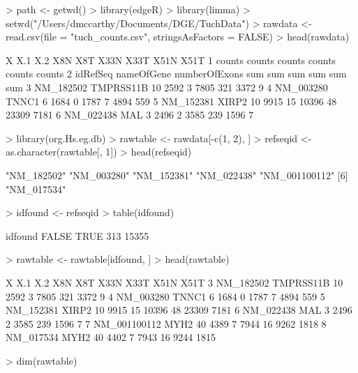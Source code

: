 \begin{Schunk}
\begin{Sinput}
> path <- getwd()
> library(edgeR)
> library(limma)
> setwd("/Users/dmccarthy/Documents/DGE/TuchData")
> rawdata <- read.csv(file = "tuch_counts.csv", stringsAsFactors = FALSE)
> head(rawdata)
\end{Sinput}
\begin{Soutput}
          X        X.1           X.2    X8N    X8T   X33N   X33T   X51N   X51T
1                                    counts counts counts counts counts counts
2  idRefSeq nameOfGene numberOfExons    sum    sum    sum    sum    sum    sum
3 NM_182502  TMPRSS11B            10   2592      3   7805    321   3372      9
4 NM_003280      TNNC1             6   1684      0   1787      7   4894    559
5 NM_152381      XIRP2            10   9915     15  10396     48  23309   7181
6 NM_022438        MAL             3   2496      2   3585    239   1596      7
\end{Soutput}
\begin{Sinput}
> library(org.Hs.eg.db)
> rawtable <- rawdata[-c(1, 2), ]
> refseqid <- as.character(rawtable[, 1])
> head(refseqid)
\end{Sinput}
\begin{Soutput}
[1] "NM_182502"    "NM_003280"    "NM_152381"    "NM_022438"    "NM_001100112"
[6] "NM_017534"   
\end{Soutput}
\begin{Sinput}
> idfound <- refseqid %
> table(idfound)
\end{Sinput}
\begin{Soutput}
idfound
FALSE  TRUE 
  313 15355 
\end{Soutput}
\begin{Sinput}
> rawtable <- rawtable[idfound, ]
> head(rawtable)
\end{Sinput}
\begin{Soutput}
             X       X.1 X.2  X8N X8T  X33N X33T  X51N X51T
3    NM_182502 TMPRSS11B  10 2592   3  7805  321  3372    9
4    NM_003280     TNNC1   6 1684   0  1787    7  4894  559
5    NM_152381     XIRP2  10 9915  15 10396   48 23309 7181
6    NM_022438       MAL   3 2496   2  3585  239  1596    7
7 NM_001100112      MYH2  40 4389   7  7944   16  9262 1818
8    NM_017534      MYH2  40 4402   7  7943   16  9244 1815
\end{Soutput}
\begin{Sinput}
> dim(rawtable)
\end{Sinput}
\begin{Soutput}

\end{Soutput}
\end{Schunk}
